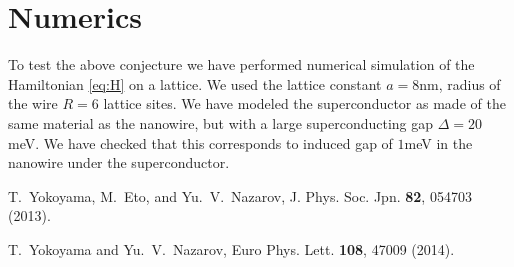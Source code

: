 \documentclass[
10pt, %
a4paper, %
oneside, %
BCOR5mm, %
]{scrartcl}
\begin{document}
\section{Numerics}

To test the above conjecture we have performed numerical simulation of the Hamiltonian \eqref{eq:H} on a lattice. We used the lattice constant $a=8$nm, radius of the wire $R=6$ lattice sites. We have modeled the superconductor as made of the same material as the nanowire, but with a large superconducting gap $\Delta = 20$meV. We have checked that this corresponds to induced gap of $1$meV in the nanowire under the superconductor. 

\begin{thebibliography}{100}
T.~Yokoyama, M.~Eto, and Yu.~V.~Nazarov, J. Phys. Soc. Jpn. \textbf{82}, 054703 (2013).

T.~Yokoyama and Yu.~V.~Nazarov, Euro Phys. Lett. \textbf{108}, 47009 (2014).
\end{thebibliography}
\end{document}
